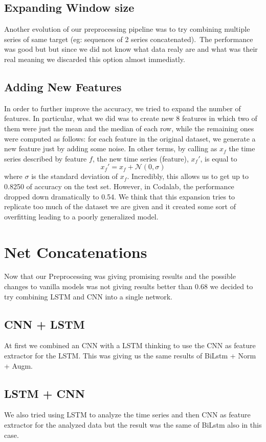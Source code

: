 \documentclass[11pt]{article}
\begin{document}
\subsection{Expanding Window size}
Another evolution of our preprocessing pipeline was to try combining multiple series of same target (eg: sequences of 2 series concatenated).\
The performance was good but  but since we did not know what data realy are and what was their real meaning we discarded this option almost immediatly.
\subsection{Adding New Features}
In order to further improve the accuracy, we tried to expand the number of features. In particular, what we did was to create new 8 features in which two of them were just the mean and the median of each row, while the remaining ones were computed as follows: for each feature in the original dataset, we generate a new feature just by adding some noise. In other terms, by calling as $x_f$ the time series described by feature $f$, the new time series (feature), $x_f'$, is equal to
\begin{equation*}
    x_f' = x_f + \mathcal{N}(0, \sigma)
\end{equation*}
where $\sigma$ is the standard deviation of $x_f$. Incredibly, this allows us to get up to 0.8250 of accuracy on the test set. However, in Codalab, the performance dropped down dramatically to 0.54. We think that this expansion tries to replicate too much of the dataset we are given and it created some sort of overfitting leading to a poorly generalized model.
\section{Net Concatenations}
Now that our Preprocessing was giving promising results and the possible changes to vanilla models was not giving results better than 0.68
we decided to try combining LSTM and CNN into a single network.
\subsection{CNN + LSTM}
At first we combined an CNN with a LSTM thinking to use the CNN as feature extractor for the LSTM.
This was giving us the same results of BiLstm + Norm + Augm.
\subsection{LSTM + CNN}
We also tried using LSTM to analyze the time series and then CNN as feature extractor for the analyzed data
but the result was the same of BiLstm also in this case.
\end{document}
